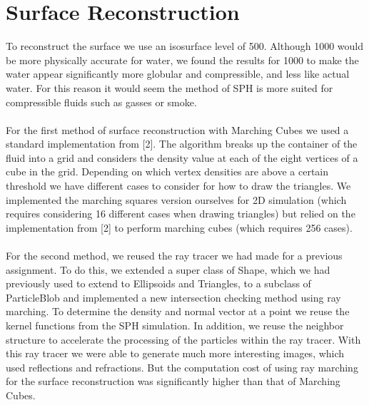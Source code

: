 \documentclass[11pt]{article}
\begin{document}
\section*{Surface Reconstruction}
To reconstruct the surface we use an isosurface level of 500. Although 1000 would be more physically accurate for water, we found the results for 1000 to make the water appear significantly more globular and compressible, and less like actual water. For this reason it would seem the method of SPH is more suited for compressible fluids such as gasses or smoke.
\\
\\
For the first method of surface reconstruction with Marching Cubes we used a standard implementation from [2]. The algorithm breaks up the container of the fluid into a grid and considers the density value at each of the eight vertices of a cube in the grid. Depending on which vertex densities are above a certain threshold we have different cases to consider for how to draw the triangles. We implemented the marching squares version ourselves for 2D simulation (which requires considering 16 different cases when drawing triangles) but relied on the implementation from [2] to perform marching cubes (which requires 256 cases).
\\
\\
For the second method, we reused the ray tracer we had made for a previous assignment. To do this, we extended a super class of Shape, which we had previously used to extend to Ellipsoids and Triangles, to a subclass of ParticleBlob and implemented a new intersection checking method using ray marching. To determine the density and normal vector at a point we reuse the kernel functions from the SPH simulation. In addition, we reuse the neighbor structure to accelerate the processing of the particles within the ray tracer. With this ray tracer we were able to generate much more interesting images, which used reflections and refractions. But the computation cost of using ray marching for the surface reconstruction was significantly higher than that of Marching Cubes.
\end{document}
